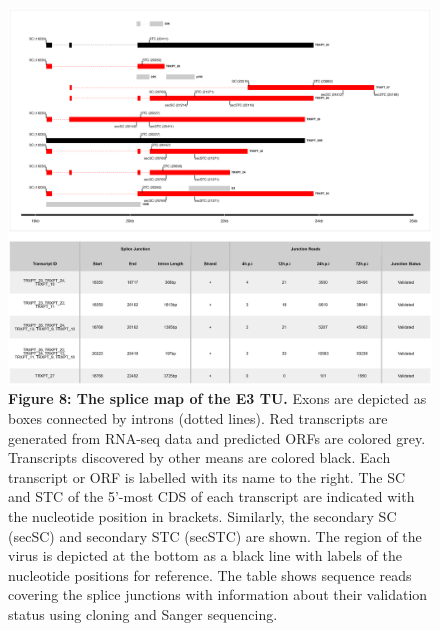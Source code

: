 \documentclass[
]{article}
\begin{document}
\begin{figure}
\centering
\includegraphics{results/r/figures/figure8.png}
\caption{\textbf{Figure 8: The splice map of the E3 TU.} Exons are
depicted as boxes connected by introns (dotted lines). Red transcripts
are generated from RNA-seq data and predicted ORFs are colored grey.
Transcripts discovered by other means are colored black. Each transcript
or ORF is labelled with its name to the right. The SC and STC of the
5'-most CDS of each transcript are indicated with the nucleotide
position in brackets. Similarly, the secondary SC (secSC) and secondary
STC (secSTC) are shown. The region of the virus is depicted at the
bottom as a black line with labels of the nucleotide positions for
reference. The table shows sequence reads covering the splice junctions
with information about their validation status using cloning and Sanger
sequencing.}
\end{figure}
\end{document}
